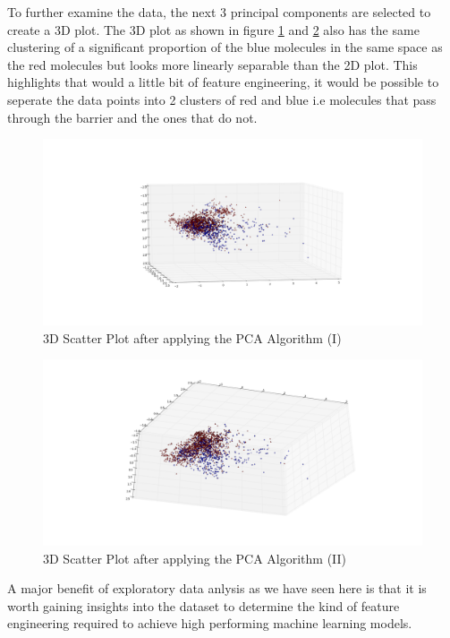 \documentclass[a4paper,12pt]{report}
\begin{document}
		To further examine the data, the next 3 principal components are selected to create a 3D plot. The 3D plot as shown in figure \ref{fig:scatter_pca_3D} and \ref{fig:scatter_pca_3D_2} also has the same clustering of a significant proportion of the blue molecules in the same space as the red molecules but looks more linearly separable than the 2D plot. This highlights that would a little bit of feature engineering, it would be possible to seperate the data points into 2 clusters of red and blue i.e molecules that pass through the barrier and the ones that do not. 
		\begin{figure}[H]
			\centering
			\includegraphics[width=\textwidth,scale=1,totalheight=0.4\textheight]{images/scatter_pca_3D}
			\caption{3D Scatter Plot after applying the PCA Algorithm (I)}
			\label{fig:scatter_pca_3D}
		\end{figure}
		\begin{figure}[H]
			\centering
			\includegraphics[width=\textwidth,scale=1,totalheight=0.4\textheight]{images/scatter_pca_3D_2}
			\caption{3D Scatter Plot after applying the PCA Algorithm (II)}
			\label{fig:scatter_pca_3D_2}
		\end{figure}
		
		A major benefit of exploratory data anlysis as we have seen here is that it is worth gaining insights into the dataset to determine the kind of feature engineering required to achieve high performing machine learning models.
	
\end{document}
